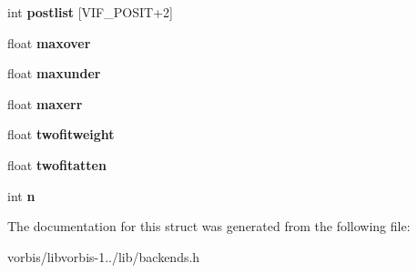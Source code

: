 \begin{DoxyCompactItemize}
\item 
\hypertarget{structvorbis__info__floor1_a153960a53326cafa537506cb9086156e}{int {\bfseries postlist} \mbox{[}V\+I\+F\+\_\+\+P\+O\+S\+I\+T+2\mbox{]}}\label{structvorbis__info__floor1_a153960a53326cafa537506cb9086156e}

\item 
\hypertarget{structvorbis__info__floor1_ab582f5329d8755a0241d98b42a686ee4}{float {\bfseries maxover}}\label{structvorbis__info__floor1_ab582f5329d8755a0241d98b42a686ee4}

\item 
\hypertarget{structvorbis__info__floor1_a910797f6fa710faef66f673ed9752fc7}{float {\bfseries maxunder}}\label{structvorbis__info__floor1_a910797f6fa710faef66f673ed9752fc7}

\item 
\hypertarget{structvorbis__info__floor1_a0119a5a0436ab3751c5c51c6e02098f6}{float {\bfseries maxerr}}\label{structvorbis__info__floor1_a0119a5a0436ab3751c5c51c6e02098f6}

\item 
\hypertarget{structvorbis__info__floor1_a410ac8aa925af6a6e367b5bb257fcc43}{float {\bfseries twofitweight}}\label{structvorbis__info__floor1_a410ac8aa925af6a6e367b5bb257fcc43}

\item 
\hypertarget{structvorbis__info__floor1_a368b3ba743a9ab96206e938ec47102ee}{float {\bfseries twofitatten}}\label{structvorbis__info__floor1_a368b3ba743a9ab96206e938ec47102ee}

\item 
\hypertarget{structvorbis__info__floor1_a8609b5acccc766282024548fd194e3f6}{int {\bfseries n}}\label{structvorbis__info__floor1_a8609b5acccc766282024548fd194e3f6}

\end{DoxyCompactItemize}


The documentation for this struct was generated from the following file\+:\begin{DoxyCompactItemize}
\item 
vorbis/libvorbis-\/1../lib/backends.\+h\end{DoxyCompactItemize}
